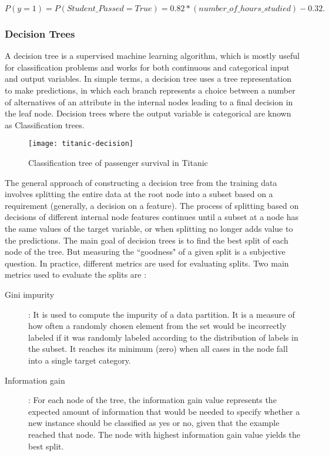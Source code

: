 \documentclass[11pt,openright]{report}
\begin{document}
\begin{equation}
 P(y=1) = P(Student\_Passed= True) = 0.82 * (number\_of\_hours\_studied) -0.32.  \label{eq:logisticExample} 
 \end{equation}

\subsubsection {Decision Trees}

A decision tree is a supervised machine learning algorithm, which is mostly useful for classification problems and works for both continuous and categorical input and output variables. In simple terms, a decision tree uses a tree representation to make predictions, in which each branch represents a choice between a number of alternatives of an attribute in the internal nodes leading to a final decision in the leaf node. Decision trees where the output variable is categorical are known as Classification trees.

  \begin{figure}
	\centering
	\texttt{[image: titanic-decision]}
	\caption{Classification tree of passenger survival in Titanic}
	\label{fig:classification_tree_titanic}
\end{figure} 

The general approach of constructing a decision tree from the training data involves splitting the entire data at the root node into a subset based on a requirement (generally, a decision on a feature). The process of splitting based on decisions of different internal node features continues until a subset at a node has the same values of the target variable, or when splitting no longer adds value to the predictions. The main goal of decision trees is to find the best split of each node of the tree. But measuring the ``goodness" of a given split is a subjective question. In practice, different metrics are used for evaluating splits. Two main metrics used to evaluate the splits are :
\begin{description}
    \item[Gini impurity]: It is used to compute the impurity of a data partition. It is a measure of how often a randomly chosen element from the set would be incorrectly labeled if it was randomly labeled according to the distribution of labels in the subset. It reaches its minimum (zero) when all cases in the node fall into a single target category. 

    \item[Information gain]: For each node of the tree, the information gain value represents the expected amount of information that would be needed to specify whether a new instance should be classified as yes or no, given that the example reached that node. The node with highest information gain value yields the best split. 
     
 \end{description}
 
\end{document}
